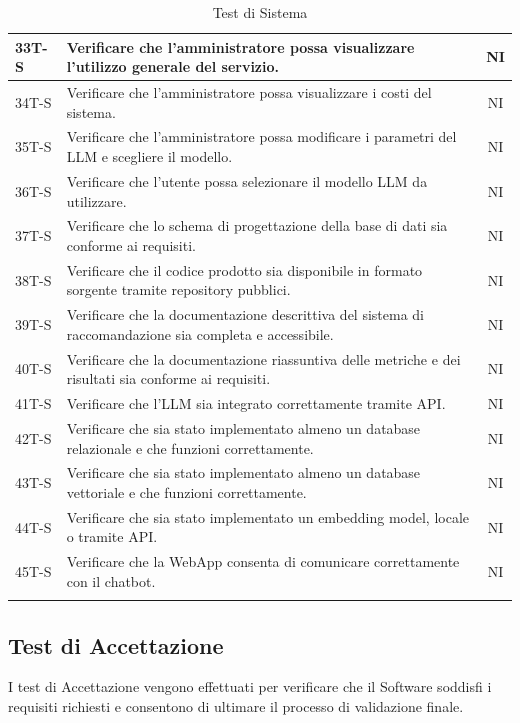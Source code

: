 \documentclass{article}
\begin{document}
\begin{longtable}{|>{\centering\arraybackslash}m{}|>{\raggedright\arraybackslash}m{}|c|}
    \hline
    33T-S & Verificare che l’amministratore possa visualizzare l’utilizzo generale del servizio. & NI \\
    \hline
    34T-S & Verificare che l’amministratore possa visualizzare i costi del sistema. & NI \\
    \hline
    35T-S & Verificare che l’amministratore possa modificare i parametri del LLM e scegliere il modello. & NI \\
    \hline
    36T-S & Verificare che l’utente possa selezionare il modello LLM da utilizzare. & NI \\
    \hline
    37T-S & Verificare che lo schema di progettazione della base di dati sia conforme ai requisiti. & NI \\
    \hline
    38T-S & Verificare che il codice prodotto sia disponibile in formato sorgente tramite repository pubblici. & NI \\
    \hline
    39T-S & Verificare che la documentazione descrittiva del sistema di raccomandazione sia completa e accessibile. & NI \\
    \hline
    40T-S & Verificare che la documentazione riassuntiva delle metriche e dei risultati sia conforme ai requisiti. & NI \\
    \hline
    41T-S & Verificare che l’LLM sia integrato correttamente tramite API. & NI \\
    \hline
    42T-S & Verificare che sia stato implementato almeno un database relazionale e che funzioni correttamente. & NI \\
    \hline
    43T-S & Verificare che sia stato implementato almeno un database vettoriale e che funzioni correttamente. & NI \\
    \hline
    44T-S & Verificare che sia stato implementato un embedding model, locale o tramite API. & NI \\
    \hline
    45T-S & Verificare che la WebApp consenta di comunicare correttamente con il chatbot. & NI \\
    \hline
\caption{Test di Sistema}
\end{longtable}



\newpage
\subsection{Test di Accettazione} %
I test di Accettazione vengono effettuati per verificare che il Software soddisfi i requisiti richiesti e consentono di ultimare il processo di validazione finale.
\end{document}
